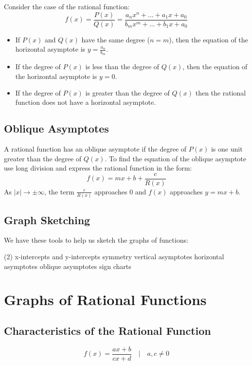 			Consider the case of the rational function:
			\[f(x)=\frac{P(x)}{Q(x)}=\frac{a_nx^n + \dots + a_1x + a_0}{b_mx^m + \dots + b_1x + a_0}\]
			\begin{itemize}
				\item If $P(x)$ and $Q(x)$ have the same degree ($n=m$), then the equation of the horizontal asymptote is $y=\frac{a_n}{b_m}$.
				\item If the degree of $P(x)$ is less than the degree of $Q(x)$, then the equation of the horizontal asymptote is $y=0$.
				\item If the degree of $P(x)$ is greater than the degree of $Q(x)$ then the rational function does not have a horizontal asymptote.
			\end{itemize}
		\subsection{Oblique Asymptotes}
			A rational function has an oblique asymptote if the degree of $P(x)$ is one unit greater than the degree of $Q(x)$. To find the equation of the oblique asymptote use long division and express the rational function in the form:
			\[f(x)=mx+b+\frac{c}{R(x)}\]
			As $|x| \to \pm\infty$, the term $\frac{c}{R(x)}$ approaches 0 and $f(x)$ approaches $y=mx+b$.
		\subsection{Graph Sketching}
			We have these tools to help us sketch the graphs of functions:
			\begin{tasks}[style=itemize](2)
				\task x-intercepts and y-intercepts
				\task symmetry
				\task vertical asymptotes
				\task horizontal asymptotes
				\task oblique asymptotes
				\task sign charts
			\end{tasks}
	\section{Graphs of Rational Functions}
		\subsection{Characteristics of the Rational Function}
			\[f(x)=\frac{ax+b}{cx+d} \quad | \quad a, c \neq 0\]

